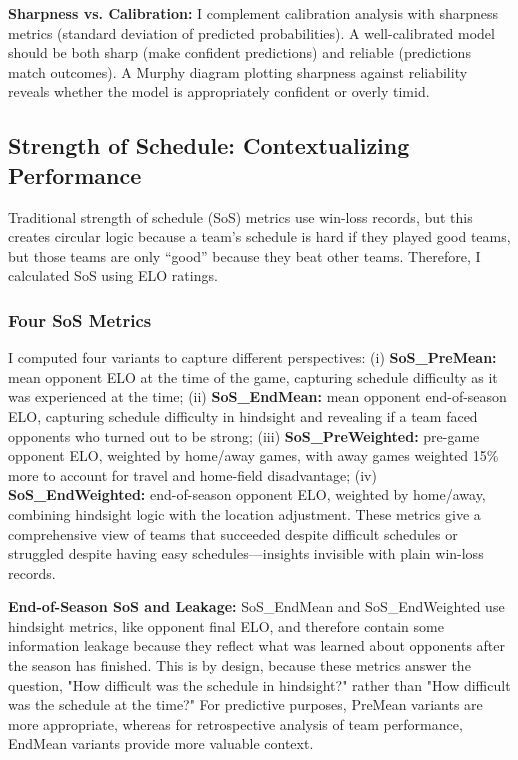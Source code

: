 \documentclass[a4paper,10.5pt,twoside]{article}
\begin{document}
\textbf{Sharpness vs. Calibration:} I complement calibration analysis with sharpness metrics (standard deviation of predicted probabilities). A well-calibrated model should be both sharp (make confident predictions) and reliable (predictions match outcomes). A Murphy diagram plotting sharpness against reliability reveals whether the model is appropriately confident or overly timid.

\subsection{Strength of Schedule: Contextualizing Performance}

Traditional strength of schedule (SoS) metrics use win-loss records, but this creates circular logic because a team's schedule is hard if they played good teams, but those teams are only ``good'' because they beat other teams. Therefore, I calculated SoS using ELO ratings.

\subsubsection{Four SoS Metrics}

I computed four variants to capture different perspectives: (i) \textbf{SoS\_PreMean:} mean opponent ELO at the time of the game, capturing schedule difficulty as it was experienced at the time; (ii) \textbf{SoS\_EndMean:} mean opponent end-of-season ELO, capturing schedule difficulty in hindsight and revealing if a team faced opponents who turned out to be strong; (iii) \textbf{SoS\_PreWeighted:} pre-game opponent ELO, weighted by home/away games, with away games weighted 15\% more to account for travel and home-field disadvantage; (iv) \textbf{SoS\_EndWeighted:} end-of-season opponent ELO, weighted by home/away, combining hindsight logic with the location adjustment. These metrics give a comprehensive view of teams that succeeded despite difficult schedules or struggled despite having easy schedules—insights invisible with plain win-loss records.

\textbf{End-of-Season SoS and Leakage:} SoS\_EndMean and SoS\_EndWeighted use hindsight metrics, like opponent final ELO, and therefore contain some information leakage because they reflect what was learned about opponents after the season has finished. This is by design, because these metrics answer the question, "How difficult was the schedule in hindsight?" rather than "How difficult was the schedule at the time?" For predictive purposes, PreMean variants are more appropriate, whereas for retrospective analysis of team performance, EndMean variants provide more valuable context.
\end{document}
